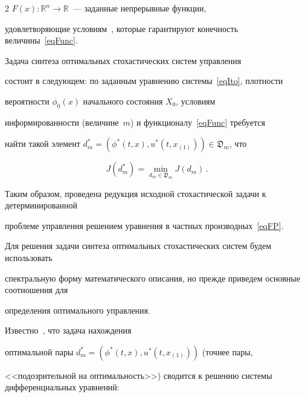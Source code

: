 \begin{multicols}{2}
${F(x) \colon \mathbb{R}^n \to \mathbb{R}}$~--- заданные непрерывные функции, 


удовле\-тво\-ря\-ющие условиям~\cite{FleRis}, которые гарантируют конечность величины~\eqref{eqFunc}.





Задача синтеза оптимальных стохастических сис\-тем управления 


со\-сто\-ит в следующем: по заданным уравнению системы~\eqref{eqIto}, плотности 


вероятности $\phi_0(x)$ начального состояния $X_0$, условиям 


информированности (величине~$m$) и функционалу~\eqref{eqFunc} требуется 


найти такой элемент ${d_m^* = (\phi^*(t,x),u^*(t,x_{(1)})) \in \mathfrak{D}_m}$, что


\begin{equation*}




  J(d_m^*) = \mathop{\min}\limits_{d_m \in \mathfrak{D}_m} J(d_m)\,.


\end{equation*}





Таким образом, проведена редукция исходной стохастической задачи к детерминированной 


проб\-ле\-ме управления решением уравнения в частных производных~\eqref{eqFP}.





Для решения задачи синтеза оптимальных стохастических систем будем использовать 


спектральную форму математического описания, но прежде приведем основные соотношения для 


определения оптимального управления.








Известно~\cite{PanBor, Pan_Synt}, что задача нахождения 


оптимальной пары ${d_m^* = (\phi^*(t,x),u^*(t,x_{(1)}))}$ (точнее пары, 


<<подозрительной на оптимальность>>) сводится к решению сис\-те\-мы дифференциальных уравнений:


\begin{equation}



\end{equation}
\end{multicols}

